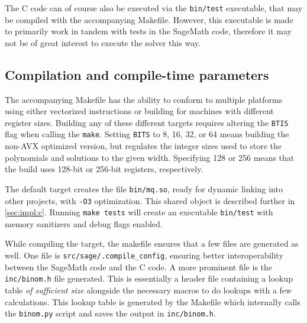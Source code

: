 The C code can of course also be executed via the \texttt{bin/test} executable, that may be compiled with the accompanying Makefile. However, this executable is made to primarily work in tandem with tests in the SageMath code, therefore it may not be of great interest to execute the solver this way.

\subsection{Compilation and compile-time parameters} \label{sec:impl:compile}
The accompanying Makefile has the ability to conform to multiple platforms using either vectorized instructions or building for machines with different register sizes. Building any of these different targets requires altering the \texttt{BTIS} flag when calling the \texttt{make}. Setting \texttt{BITS} to 8, 16, 32, or 64 means building the non-AVX optimized version, but regulates the integer sizes used to store the polynomials and solutions to the given width. Specifying 128 or 256 means that the build uses 128-bit or 256-bit registers, respectively. 

The default target creates the file \texttt{bin/mq.so}, ready for dynamic linking into other projects, with \texttt{-O3} optimization. This shared object is described further in \cref{sec:impl:c}. Running \texttt{make tests} will create an executable \texttt{bin/test} with memory sanitizers and debug flags enabled. 

While compiling the target, the makefile ensures that a few files are generated as well. One file is \texttt{src/sage/.compile\_config}, ensuring better interoperability between the SageMath code and the C code. A more prominent file is the \texttt{inc/binom.h} file generated. This is essentially a header file containing a lookup table \textit{of sufficient size} alongside the necessary macros to do lookups with a few calculations. This lookup table is generated by the Makefile which internally calls the \texttt{binom.py} script and saves the output in \texttt{inc/binom.h}.

\newpage